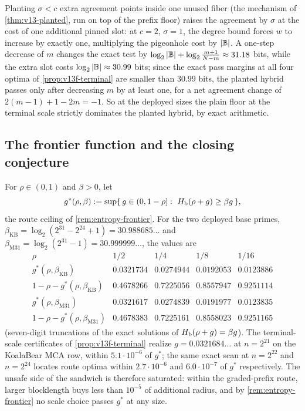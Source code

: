 \begin{remark}\label{rem:v13f-planting}
Planting $\sigma<c$ extra agreement points inside one unused fiber \textup(the mechanism of \cref{thm:v13-planted}, run on top of the prefix floor\textup) raises the agreement by $\sigma$ at the cost of one additional pinned slot: at $c=2$, $\sigma=1$, the degree bound forces $w$ to increase by exactly one, multiplying the pigeonhole cost by $|\mathbb B|$.  A one-step decrease of $m$ changes the exact test by $\log_2|\mathbb B|+\log_2\frac{m+1}{N-m}\approx31.18$ bits, while the extra slot costs $\log_2|\mathbb B|\approx30.99$ bits; since the exact pass margins at all four optima of \cref{prop:v13f-terminal} are smaller than $30.99$ bits, the planted hybrid passes only after decreasing $m$ by at least one, for a net agreement change of $2(m-1)+1-2m=-1$.  So at the deployed sizes the plain floor at the terminal scale strictly dominates the planted hybrid, by exact arithmetic.
\end{remark}

\subsection{The frontier function and the closing conjecture}

\begin{definition}\label{def:v13f-gstar}
For $\rho\in(0,1)$ and $\beta>0$, let
\[
        g^*(\rho,\beta):=\sup\{\,g\in(0,1-\rho]:\ \Hb(\rho+g)\ge\beta g\,\},
\]
the route ceiling of \cref{rem:entropy-frontier}.  For the two deployed base primes, $\beta_{\mathrm{KB}}=\log_2(2^{31}-2^{24}+1)=30.988685\ldots$ and $\beta_{\mathrm{M31}}=\log_2(2^{31}-1)=30.999999\ldots$, the values are
\[
\begin{array}{c|cccc}
\rho & 1/2 & 1/4 & 1/8 & 1/16\\ \hline
g^*(\rho,\beta_{\mathrm{KB}}) & 0.0321734 & 0.0274944 & 0.0192053 & 0.0123886\\
1-\rho-g^*(\rho,\beta_{\mathrm{KB}}) & 0.4678266 & 0.7225056 & 0.8557947 & 0.9251114\\ \hline
g^*(\rho,\beta_{\mathrm{M31}}) & 0.0321617 & 0.0274839 & 0.0191977 & 0.0123835\\
1-\rho-g^*(\rho,\beta_{\mathrm{M31}}) & 0.4678383 & 0.7225161 & 0.8558023 & 0.9251165
\end{array}
\]
\textup(seven-digit truncations of the exact solutions of $H_{\mathrm b}(\rho+g)=\beta g$\textup).  The terminal-scale certificates of \cref{prop:v13f-terminal} realize $g=0.0321684\ldots$ at $n=2^{21}$ on the KoalaBear MCA row, within $5.1\cdot10^{-6}$ of $g^*$; the same exact scan at $n=2^{22}$ and $n=2^{24}$ locates route optima within $2.7\cdot10^{-6}$ and $6.0\cdot10^{-7}$ of $g^*$ respectively.  The unsafe side of the sandwich is therefore saturated: within the graded-prefix route, larger blocklength buys less than $10^{-5}$ of additional radius, and by \cref{rem:entropy-frontier} no scale choice passes $g^*$ at any size.
\end{definition}

